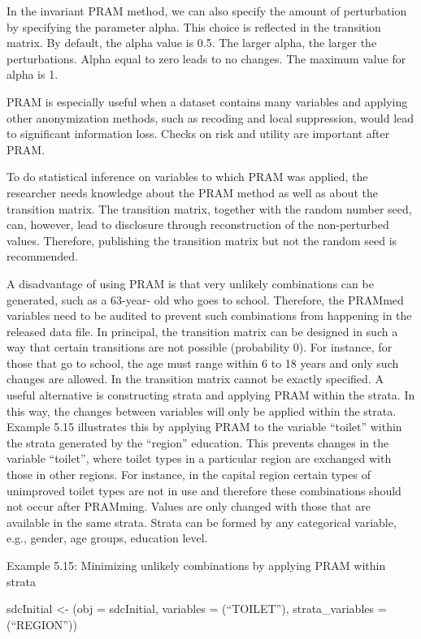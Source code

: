\documentclass[letterpaper,10pt,english]{sphinxmanual}
\begin{document}
In the invariant PRAM method, we can also specify the amount of
perturbation by specifying the parameter alpha. This choice is reflected
in the transition matrix. By default, the alpha value is 0.5. The larger
alpha, the larger the perturbations. Alpha equal to zero leads to no
changes. The maximum value for alpha is 1.

PRAM is especially useful when a dataset contains many variables and
applying other anonymization methods, such as recoding and local
suppression, would lead to significant information loss. Checks on risk
and utility are important after PRAM.

To do statistical inference on variables to which PRAM was applied, the
researcher needs knowledge about the PRAM method as well as about the
transition matrix. The transition matrix, together with the random
number seed, can, however, lead to disclosure through reconstruction of
the non-perturbed values. Therefore, publishing the transition matrix
but not the random seed is recommended.

A disadvantage of using PRAM is that very unlikely combinations can be
generated, such as a 63-year- old who goes to school. Therefore, the
PRAMmed variables need to be audited to prevent such combinations from
happening in the released data file. In principal, the transition matrix
can be designed in such a way that certain transitions are not possible
(probability 0). For instance, for those that go to school, the age must
range within 6 to 18 years and only such changes are allowed. In
 the transition matrix cannot be exactly specified. A useful
alternative is constructing strata and applying PRAM within the strata.
In this way, the changes between variables will only be applied within
the strata. Example 5.15 illustrates this by applying PRAM to the
variable “toilet” within the strata generated by the “region” education.
This prevents changes in the variable “toilet”, where toilet types in a
particular region are exchanged with those in other regions. For
instance, in the capital region certain types of unimproved toilet types
are not in use and therefore these combinations should not occur after
PRAMming. Values are only changed with those that are available in the
same strata. Strata can be formed by any categorical variable, e.g.,
gender, age groups, education level.

Example 5.15: Minimizing unlikely combinations by applying PRAM within
strata

\begin{DUlineblock}{0em}
\item[] 
\item[] sdcInitial \textless{}- (obj = sdcInitial, variables =
(“TOILET”), strata\_variables = (“REGION”))
\end{DUlineblock}
\end{document}
